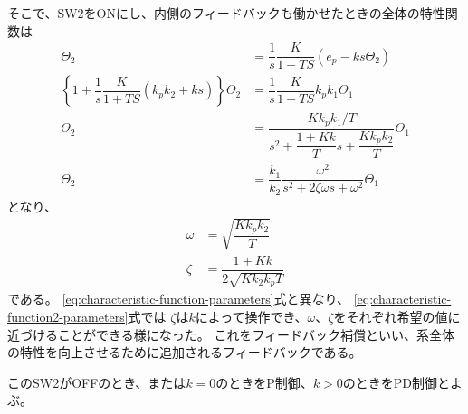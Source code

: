 \documentclass[../../../main]{subfiles}
\begin{document}
そこで、SW2をONにし、内側のフィードバックも働かせたときの全体の特性関数は
\begin{align}\label{eq:characteristic-function2}
    \Theta_2                                                                       & = \dfrac{1}{s} \dfrac{K}{1+TS} \left(e_p - ks\Theta_2\right) \nonumber                     \\
    \left\{ 1 + \dfrac{1}{s}\dfrac{K}{1+TS}\left(k_pk_2+ks\right) \right\}\Theta_2 & = \dfrac{1}{s} \dfrac{K}{1+TS} k_p k_1 \Theta_1 \nonumber                                  \\
    \Theta_2                                                                       & = \dfrac{K k_p k_1 / T}{s^2 + \dfrac{1 + Kk}{T}s + \dfrac{Kk_p k_2}{T}} \Theta_1 \nonumber \\
    \Theta_2                                                                       & = \dfrac{k_1}{k_2} \dfrac{\omega^2}{s^2 + 2\zeta\omega s + \omega^2} \Theta_1
\end{align}
となり、
\begin{equation}\label{eq:characteristic-function2-parameters}
    \begin{split}
        \omega & = \sqrt{\dfrac{K k_p k_2}{T}}    \\
        \zeta  & = \dfrac{1+Kk}{2\sqrt{Kk_2k_pT}}
    \end{split}
\end{equation}
である。
\ref{eq:characteristic-function-parameters}式と異なり、
\ref{eq:characteristic-function2-parameters}式では
$\zeta$は$k$によって操作でき、$\omega$、$\zeta$をそれぞれ希望の値に近づけることができる様になった。
これをフィードバック補償といい、系全体の特性を向上させるために追加されるフィードバックである。

このSW2がOFFのとき、または$k=0$のときをP制御、$k>0$のときをPD制御とよぶ。
\end{document}
